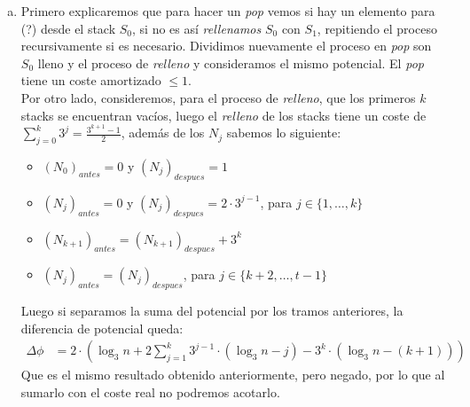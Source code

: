 \documentclass[dcc,uchile]{fcfmcourse}
\theoremstyle{plain}
\theoremstyle{definition}
\begin{document}
\begin{problems}
\begin{enumerate}[a)]
\begin{align*}
        \\
        &=  2\cdot \left( -\log_3{n} + 3^k \cdot (\log_3{n}-1) - k3^k - 2(\log_3{n}-1)\sum_{j=0}^{k-1} 3^{j}
        + 2\cdot \sum_{j=0}^{k-1} j3^{j}\right) \\
        &=  2\cdot \left( -\log_3{n} + 3^k \cdot (\log_3{n}-1) - k3^k - (\log_3{n}-1)\cdot (3^k - 1)
        + 2\cdot \sum_{j=0}^{k-1} j3^{j}\right)
    \end{align*}
    \begin{align*}
        &=  2\cdot \left( -1 - k3^k + 2\cdot \sum_{j=0}^{k-1} j3^{j}\right)\\
        &=  2\cdot \left( -1 - k3^k + 2\cdot \frac{1}{4}(2\cdot 3^{k}(k-1) - 3^{k} + 3)\right)\\
        &=  -2 - 2k3^k + 2\cdot 3^{k}(k-1) - 3^{k} + 3\right)\\
        &= 1 - 3^{k+1}
    \end{align*}
    que si le sumamos al coste real nos queda un coste amortizado menor a cero.
    
    \item Primero explicaremos que para hacer un \textit{pop} vemos si hay un elemento para  (?) desde el stack $S_{0}$, si no es así \textit{rellenamos} $S_{0}$ con $S_{1}$, repitiendo el proceso recursivamente si es necesario. Dividimos nuevamente el proceso en \textit{pop} son $S_{0}$ lleno y el proceso de \textit{relleno} y consideramos el mismo potencial. El \textit{pop} tiene un coste amortizado $\le 1$.\\
    Por otro lado, consideremos, para el proceso de \textit{relleno}, que los primeros $k$ stacks se encuentran vacíos, luego el \textit{relleno} de los stacks tiene un coste de $\sum_{j = 0}^{k} 3^{j} = \frac{3^{k+1}-1}{2}$, además de los $N_{j}$ sabemos lo siguiente:
    \begin{itemize}
        \item $(N_{0})_{antes} = 0$ y $(N_{j})_{despues} = 1$
        \item $(N_{j})_{antes} = 0$ y $(N_{j})_{despues} =2\cdot3^{j-1}$, para $j \in \{1, \ldots, k\}$
        \item $(N_{k+1})_{antes} = (N_{k+1})_{despues} + 3^k$
        \item $(N_{j})_{antes} = (N_{j})_{despues}$, para $j \in \{k+2, \ldots, t-1\}$
    \end{itemize}
    Luego si separamos la suma del potencial por los tramos anteriores, la diferencia de potencial queda:
    \begin{align*}
        \Delta \phi &=  2\cdot \left( \log_3{n} + 2\sum_{j=1}^{k} 3^{j-1} \cdot (\log_3{n} − j) - 3^{k}\cdot (\log_3{n} − (k+1)) \right)
    \end{align*}
    Que es el mismo resultado obtenido anteriormente, pero negado, por lo que al sumarlo con el coste real no podremos acotarlo.
\end{enumerate}
\end{problems}
\end{document}
